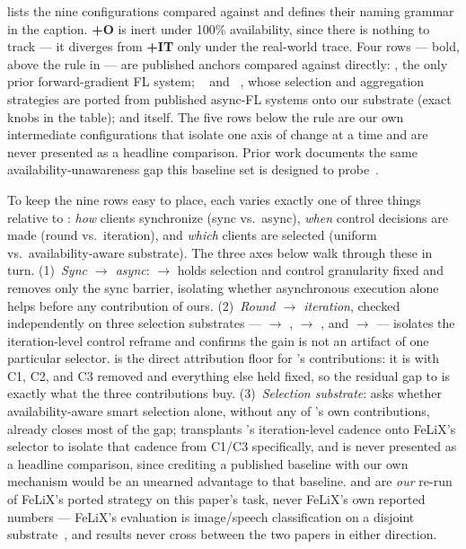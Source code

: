  lists the nine configurations compared
against \sys{} and defines their naming grammar in the caption.
\textbf{+O} is inert under 100\% availability, since there is nothing
to track --- it diverges from \textbf{+IT} only under the real-world
trace. Four rows --- bold, above the rule in
 --- are published anchors compared against
\sys{} directly: \fwdllm{}, the only prior forward-gradient FL system;
\fedbuffp{}~\cite{nguyen2022fedbuff} and
\felixp{}~\cite{garg2026felix}, whose selection and aggregation
strategies are ported from published async-FL systems onto our
substrate (exact knobs in the table); and \sys{} itself. The five rows
below the rule are our own intermediate configurations that isolate
one axis of change at a time and are never presented as a headline
comparison. Prior work documents the same availability-unawareness gap
this baseline set is designed to probe~\cite{garg2025avail}.

To keep the nine rows easy to place, each varies exactly one of three
things relative to \fwdllm{}: \emph{how} clients synchronize (sync
vs.\ async), \emph{when} control decisions are made (round vs.\
iteration), and \emph{which} clients are selected (uniform vs.\
availability-aware substrate). The three axes below walk through these
in turn. (1)~\emph{Sync $\to$ async}: \fwdllm{} $\to$ \fedbuffp{}
holds selection and control granularity fixed and removes only the
sync barrier, isolating whether asynchronous execution alone helps
before any contribution of ours. (2)~\emph{Round $\to$ iteration},
checked independently on three selection substrates --- \fwdllm{}
$\to$ \fwdllmit{}, \fedbuffp{} $\to$ \fedbuffpit{}, and \felixp{}
$\to$ \felixpit{} --- isolates the iteration-level control reframe and
confirms the gain is not an artifact of one particular selector.
\fedbuffpit{} is the direct attribution floor for \sys{}'s
contributions: it is \sys{} with C1, C2, and C3 removed and everything
else held fixed, so the residual gap to \sys{} is exactly what the
three contributions buy. (3)~\emph{Selection substrate}: \felixp{}
asks whether availability-aware smart selection alone, without any of
\sys{}'s own contributions, already closes most of the gap;
\felixpit{} transplants \sys{}'s iteration-level cadence onto FeLiX's
selector to isolate that cadence from C1/C3 specifically, and is never
presented as a headline comparison, since crediting a published
baseline with our own mechanism would be an unearned advantage to that
baseline. \felixp{} and \felixpit{} are \emph{our} re-run of FeLiX's
ported strategy on this paper's task, never FeLiX's own reported
numbers --- FeLiX's evaluation is image/speech classification on a
disjoint substrate~\cite{garg2026felix}, and results never cross
between the two papers in either direction.

